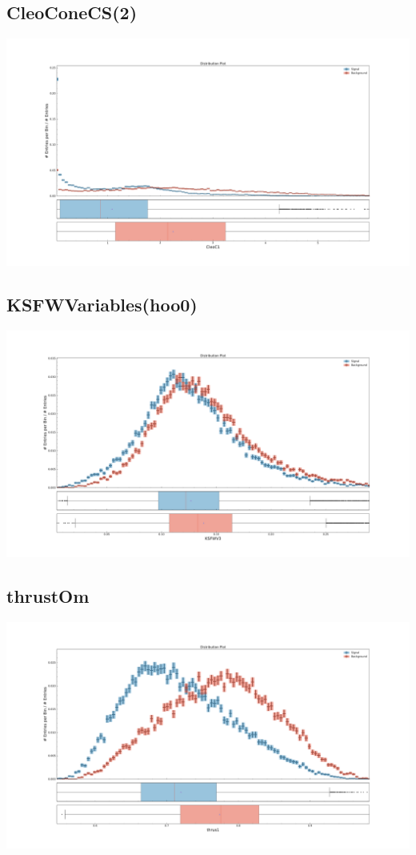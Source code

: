 \documentclass[10pt,a4paper]{article}
\begin{document}
\subsection{CleoConeCS(2)}
\begin{center}
\includegraphics[width=1.0\textwidth]{variable_5452775316428386635.pdf}
\end{center}
\subsection{KSFWVariables(hoo0)}
\begin{center}
\includegraphics[width=1.0\textwidth]{variable_4125238112556289389.pdf}
\end{center}
\subsection{thrustOm}
\begin{center}
\includegraphics[width=1.0\textwidth]{variable_-1774228743304352852.pdf}
\end{center}
\end{document}
